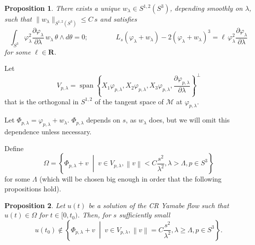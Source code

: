 \documentclass[10pt,a4paper]{amsart}
\newtheorem{proposizione}{Proposition}[section]
\renewcommand{\phi}{\varphi}
\newcommand{\de}{\partial}
\newcommand{\R}{\mathbf{R}}
\newcommand{\ci}[1]{\mathscr{#1}}%
\newcommand{\rosso}[1]{{\color{red}#1}}
\newcommand{\verde}[1]{{\color{green}#1}}
\newcommand{\N}[1]{\left\lVert#1\right\rVert}
\begin{document}
\begin{proposizione} 
There exists a unique $w_\lambda \in S^{1,2}(S^3)$, depending 
smoothly on $\lambda$, such that $\|w_\lambda\|_{S^{1,2}(S^3)} \leq C \, s$ and satisfies 
\begin{equation*}
\int_{S^3} \phi_{\lambda}^2 \frac{\de\phi_{\lambda}}{\de\lambda} \, w_\lambda  \, 
   \theta\wedge d\theta = 0; \qquad \qquad  L_s (\phi_{\lambda} + w_\lambda)  - 2 
   (\phi_{\lambda} + w_\lambda)^3 
   = \ell \, \phi_\lambda^2 \frac{\de\phi_{\lambda}}{\de\lambda} 
\end{equation*}
for some $\ell \in \R$.
\end{proposizione}

Let
$$V_{p,\lambda}=\operatorname{span}\left\{X_1\phi_{p,\lambda}, X_2\phi_{p,\lambda},X_3\phi_{p,\lambda},\frac{\de\phi_{p,\lambda}}{\de\lambda}\right\}^{\perp}$$
that is the orthogonal in $S^{1,2}$ of the tangent space of $\ci{M}$ at $\phi_{p,\lambda}$.

Let $\Phi_{p,\lambda}=\phi_{p,\lambda} + w_\lambda$. $\Phi_{p,\lambda}$ depends on $s$, as $w_\lambda$ does, but we will omit this dependence unless necessary.

Define
$$\Omega=\left\{\Phi_{p,\lambda}+v\;\middle|\; v\in V_{p,\lambda}, \N{v}<C\frac{s^2}{\lambda^2}, \lambda>\Lambda,p\in S^3
\right\}$$
for some $\Lambda$ (which will be chosen big enough in order that the following propositions hold).

\begin{proposizione}\label{PropositionLateralBoundary}
 Let $u(t)$ be a solution of the CR Yamabe flow such that $u(t)\in\Omega$ for $t\in[0,t_0)$. Then, for $s$ sufficiently small
 $$u(t_0)\not\in\left\{\Phi_{p,\lambda}+v\;\middle|\; v\in V_{p,\lambda}, \N{v}=C\frac{s^2}{\lambda^2}, \lambda\ge\Lambda,p\in S^3 \right\}.$$
\end{proposizione}
\end{document}
